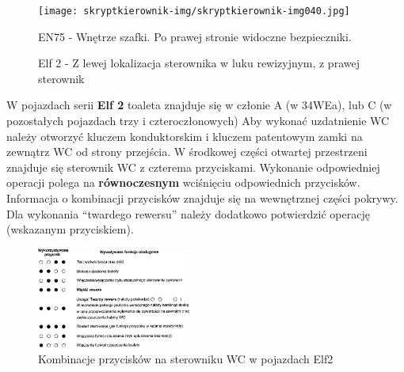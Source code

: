 \begin{figure}
		\texttt{[image: skryptkierownik-img/skryptkierownik-img040.jpg]}
		\caption{EN75 - Wnętrze szafki. Po prawej stronie widoczne bezpieczniki.}
\end{figure}
\begin{figure}
	\caption{Elf 2 - Z lewej lokalizacja sterownika w luku rewizyjnym, z prawej sterownik}	
\end{figure}
W pojazdach serii \textbf{Elf 2} toaleta znajduje się w członie A (w 34WEa), lub C (w pozostałych pojazdach trzy i czteroczłonowych) Aby wykonać uzdatnienie WC należy otworzyć kluczem konduktorskim i kluczem patentowym zamki na zewnątrz WC od strony przejścia. W środkowej części otwartej przestrzeni znajduje się sterownik WC z czterema przyciskami. Wykonanie odpowiedniej operacji polega na \textbf{równoczesnym }wciśnięciu odpowiednich przycisków. Informacja o kombinacji przycisków znajduje się na wewnętrznej części pokrywy. Dla wykonania “twardego rewersu” należy dodatkowo potwierdzić operację (wskazanym przyciskiem).
\begin{figure}
	\includegraphics[width=0.45\textwidth]{skryptkierownik-img/wc-elf2.png}
	\caption{Kombinacje przycisków na sterowniku WC w pojazdach Elf2}
\end{figure}
